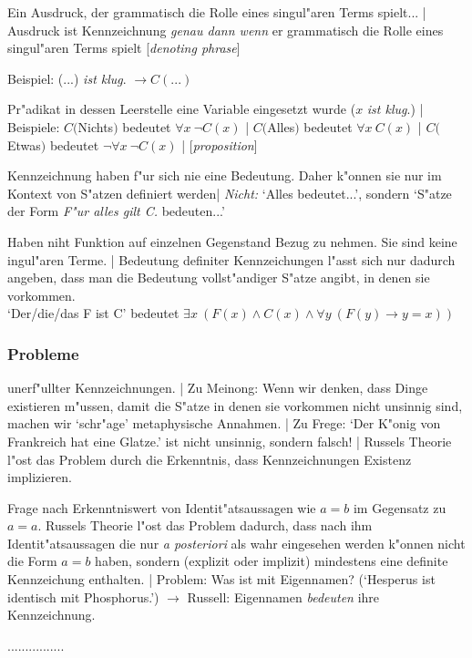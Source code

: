 \documentclass[emulatestandardclasses]{scrartcl}
\begin{document}
\begin{description}[leftmargin=!,labelwidth=\widthof{\bfseries Gebrauchsdefinition}]
    \item[Kennzeichnung] Ein Ausdruck, der grammatisch die Rolle eines singul"aren Terms spielt... | Ausdruck ist Kennzeichnung \emph{genau dann wenn} er grammatisch die Rolle eines singul"aren Terms spielt [\emph{denoting phrase}]
    \item[Pr"adikat] Beispiel: (...) \emph{ist klug}. $\rightarrow C(...)$
    \item[Aussage] Pr"adikat in dessen Leerstelle eine Variable eingesetzt wurde ($x$ \emph{ist klug}.) | Beispiele: $C($Nichts$)$ bedeutet $\forall x~\neg C(x)$ | $C($Alles$)$ bedeutet $\forall x~C(x)$ | $C($Etwas$)$ bedeutet $\neg \forall x~\neg C(x)$ | [\emph{proposition}]
    \item[Gebrauchsdefinition] Kennzeichnung haben f"ur sich nie eine Bedeutung. Daher k"onnen sie nur im Kontext von S"atzen definiert werden| \emph{Nicht:} `Alles bedeutet...', sondern `S"atze der Form \emph{F"ur alles gilt C.} bedeuten...'  
    \item[Definite Kennz.]Haben niht Funktion auf einzelnen Gegenstand Bezug zu nehmen. Sie sind keine ingul"aren Terme. | Bedeutung definiter Kennzeichungen l"asst sich nur dadurch angeben, dass man die Bedeutung vollst"andiger S"atze angibt, in denen sie vorkommen.\\`Der/die/das F ist C' bedeutet $\exists x~(F(x) \wedge C(x) \wedge \forall y~(F(y) \rightarrow y = x) )$
\end{description}

\subsubsection{Probleme}

\begin{description}[leftmargin=!,labelwidth=\widthof{\bfseries Probl. des Bezugs}]
    \item[Probl. des Bezugs] unerf"ullter Kennzeichnungen. | Zu Meinong: Wenn wir denken, dass Dinge existieren m"ussen, damit die S"atze in denen sie vorkommen nicht unsinnig sind, machen wir `schr"age' metaphysische Annahmen. | Zu Frege: `Der K"onig von Frankreich hat eine Glatze.' ist nicht unsinnig, sondern falsch! | Russels Theorie l"ost das Problem durch die Erkenntnis, dass Kennzeichnungen Existenz implizieren.
    \item[Freges R"atsel] Frage nach Erkenntniswert von Identit"atsaussagen wie $a = b$ im Gegensatz zu $a = a$. Russels Theorie l"ost das Problem dadurch, dass nach ihm Identit"atsaussagen die nur \emph{a posteriori} als wahr eingesehen werden k"onnen nicht die Form $a = b$ haben, sondern (explizit oder implizit) mindestens eine definite Kennzeichung enthalten. | Problem: Was ist mit Eigennamen? (`Hesperus ist identisch mit Phosphorus.') $\rightarrow$ Russell: Eigennamen \emph{bedeuten} ihre Kennzeichnung.
    \item[...] ................
\end{description}
\end{document}
